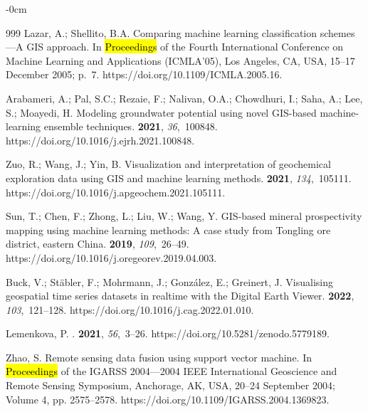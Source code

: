 \documentclass[data,article,accept,pdftex,moreauthors]{Definitions/mdpi}
\begin{document}
{\begin{adjustwidth}{-\extralength}{0cm}
\begin{thebibliography}{999}
Lazar, A.; Shellito, B.A.
\newblock Comparing machine learning classification schemes---A GIS approach.
\newblock In \hl{Proceedings} %
 of the Fourth International Conference on Machine
 Learning and Applications (ICMLA'05), Los Angeles, CA, USA, 15--17 December 2005; p.~7. https://doi.org/10.1109/ICMLA.2005.16.

Arabameri, A.; Pal, S.C.; Rezaie, F.; Nalivan, O.A.; Chowdhuri, I.; Saha, A.;
 Lee, S.; Moayedi, H.
\newblock Modeling groundwater potential using novel GIS-based machine-learning
 ensemble techniques.
 {\bf 2021}, {\em
 36},~100848.
https://doi.org/10.1016/j.ejrh.2021.100848.

Zuo, R.; Wang, J.; Yin, B.
\newblock Visualization and interpretation of geochemical exploration data
 using GIS and machine learning methods.
 {\bf 2021}, {\em 134},~105111.
https://doi.org/10.1016/j.apgeochem.2021.105111.

Sun, T.; Chen, F.; Zhong, L.; Liu, W.; Wang, Y.
\newblock GIS-based mineral prospectivity mapping using machine learning
 methods: A case study from Tongling ore district, eastern China.
 {\bf 2019}, {\em 109},~26--49.
https://doi.org/10.1016/j.oregeorev.2019.04.003.

Buck, V.; Stäbler, F.; Mohrmann, J.; González, E.; Greinert, J.
\newblock Visualising geospatial time series datasets in realtime with the
 Digital Earth Viewer.
 {\bf 2022}, {\em 103},~121--128.
https://doi.org/10.1016/j.cag.2022.01.010.

Lemenkova, P.
.
 {\bf 2021}, {\em 56},~3--26.
https://doi.org/10.5281/zenodo.5779189.

Zhao, S.
\newblock Remote sensing data fusion using support vector machine.
\newblock In \hl{Proceedings} %
 of the IGARSS 2004---2004 IEEE International Geoscience
 and Remote Sensing Symposium, Anchorage, AK, USA, 20--24 September 2004; Volume 4, pp. 2575--2578. https://doi.org/10.1109/IGARSS.2004.1369823.


\end{thebibliography}
\end{adjustwidth}}
\end{document}
